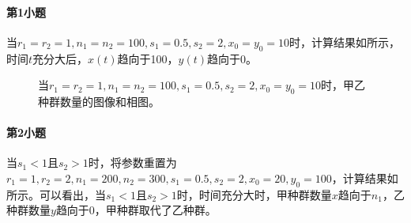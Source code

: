 \documentclass[12pt,a4paper]{article}
\begin{document}
\paragraph{第1小题} 当$r_1=r_2=1,n_1=n_2=100,s_1=0.5,s_2=2,x_0=y_0=10$时，计算结果如所示，时间$t$充分大后，$x(t)$趋向于100，$y(t)$趋向于0。

\begin{figure}[t]
    \centering
    \caption{当$r_1=r_2=1,n_1=n_2=100,s_1=0.5,s_2=2,x_0=y_0=10$时，甲乙种群数量的图像和相图。}
    \label{fig:ex9_sub1}
\end{figure}

\paragraph{第2小题} 当$s_1 < 1$且$s_2 > 1$时，将参数重置为$r_1=1,r_2=2,n_1=200,n_2=300,s_1=0.5,s_2=2,x_0=20,y_0=100$，计算结果如所示。可以看出，当$s_1 < 1$且$s_2 > 1$时，时间充分大时，甲种群数量$x$趋向于$n_1$，乙种群数量$y$趋向于0，甲种群取代了乙种群。
\end{document}
